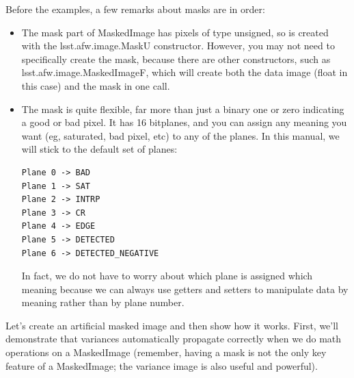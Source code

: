 Before the examples, a few remarks about masks are in order:
\begin{itemize}
\item The mask part of MaskedImage has pixels of type unsigned, so is
  created with the lsst.afw.image.MaskU constructor.  However, you may
  not need to specifically create the mask, because there are other
  constructors, such as lsst.afw.image.MaskedImageF, which will create
  both the data image (float in this case) and the mask in one call.
\item The mask is quite flexible, far more than just a binary one or
  zero indicating a good or bad pixel.  It has 16 bitplanes, and you
  can assign any meaning you want (eg, saturated, bad pixel, etc) to
  any of the planes.  In this manual, we will stick to the default set
  of planes:
\begin{verbatim}
Plane 0 -> BAD
Plane 1 -> SAT
Plane 2 -> INTRP
Plane 3 -> CR
Plane 4 -> EDGE
Plane 5 -> DETECTED
Plane 6 -> DETECTED_NEGATIVE
\end{verbatim}
In fact, we do not have to worry about which plane is
  assigned which meaning because we can always use getters and setters
  to manipulate data by meaning rather than by plane number.
\end{itemize}

%
%


Let's create an artificial masked image and then show how it works.
First, we'll demonstrate that variances automatically propagate
correctly when we do math operations on a MaskedImage (remember,
having a mask is not the only key feature of a MaskedImage; the
variance image is also useful and powerful).


